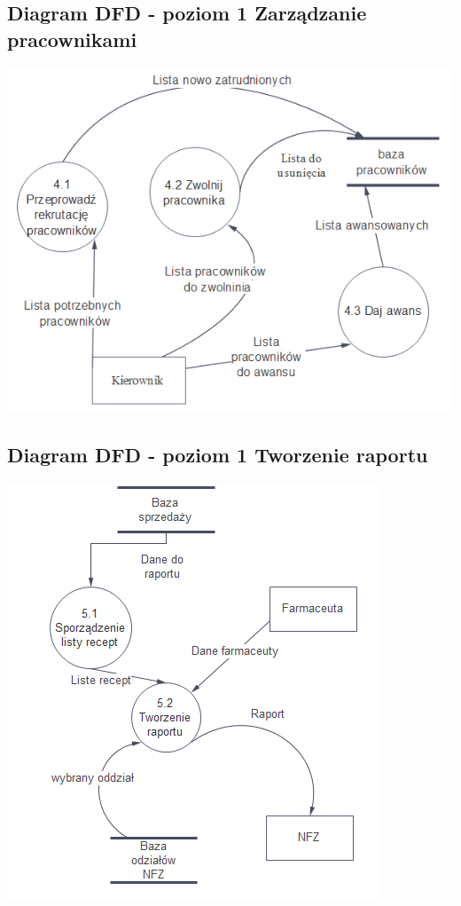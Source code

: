 \documentclass[a4paper, 11pt]{article}
\begin{document}
	\subsection{Diagram DFD - poziom 1 Zarządzanie pracownikami}
		\includegraphics[scale=1]{zarzadzaniePracownikami2.PNG} 
		
	\subsection{Diagram DFD - poziom 1 Tworzenie raportu}
		\includegraphics[scale=1]{tworzenieRaportu.PNG} 
		
\end{document}
